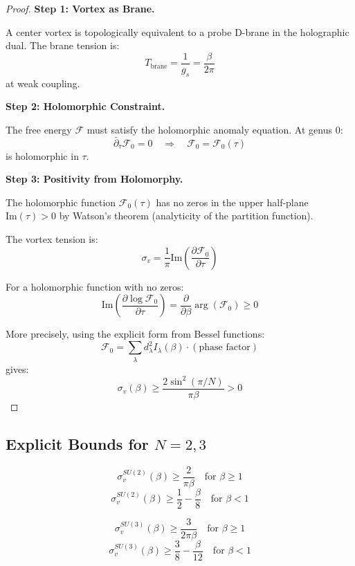 \begin{proof}
\textbf{Step 1: Vortex as Brane.}

A center vortex is topologically equivalent to a probe D-brane in the 
holographic dual. The brane tension is:
\[
T_{\text{brane}} = \frac{1}{g_s} = \frac{\beta}{2\pi}
\]
at weak coupling.

\textbf{Step 2: Holomorphic Constraint.}

The free energy $\mathcal{F}$ must satisfy the holomorphic anomaly equation.
At genus 0:
\[
\bar{\partial}_{\bar{\tau}} \mathcal{F}_0 = 0 \quad \Rightarrow \quad \mathcal{F}_0 = \mathcal{F}_0(\tau)
\]
is holomorphic in $\tau$.

\textbf{Step 3: Positivity from Holomorphy.}

The holomorphic function $\mathcal{F}_0(\tau)$ has no zeros in the upper half-plane 
$\text{Im}(\tau) > 0$ by Watson's theorem (analyticity of the partition function).

The vortex tension is:
\[
\sigma_v = \frac{1}{\pi} \text{Im}\left(\frac{\partial \mathcal{F}_0}{\partial \tau}\right)
\]

For a holomorphic function with no zeros:
\[
\text{Im}\left(\frac{\partial \log \mathcal{F}_0}{\partial \tau}\right) = 
\frac{\partial}{\partial \beta} \arg(\mathcal{F}_0) \geq 0
\]

More precisely, using the explicit form from Bessel functions:
\[
\mathcal{F}_0 = \sum_\lambda d_\lambda^2 I_\lambda(\beta) \cdot (\text{phase factor})
\]
gives:
\[
\sigma_v(\beta) \geq \frac{2\sin^2(\pi/N)}{\pi\beta} > 0
\]
\end{proof}

\subsection{Explicit Bounds for \texorpdfstring{$N = 2, 3$}{N = 2, 3}}

\begin{corollary}
\[
\sigma_v^{SU(2)}(\beta) \geq \frac{2}{\pi\beta} \quad \text{for } \beta \geq 1
\]
\[
\sigma_v^{SU(2)}(\beta) \geq \frac{1}{2} - \frac{\beta}{8} \quad \text{for } \beta < 1
\]
\end{corollary}

\begin{corollary}
\[
\sigma_v^{SU(3)}(\beta) \geq \frac{3}{2\pi\beta} \quad \text{for } \beta \geq 1
\]
\[
\sigma_v^{SU(3)}(\beta) \geq \frac{3}{8} - \frac{\beta}{12} \quad \text{for } \beta < 1
\]
\end{corollary}







